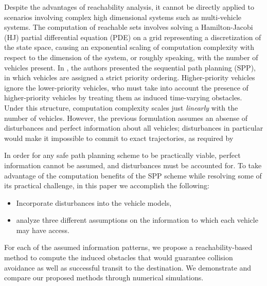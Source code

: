 Despite the advantages of reachability analysis, it cannot be directly applied to scenarios involving complex high dimensional systems such as multi-vehicle systems. The computation of reachable sets involves solving a Hamilton-Jacobi (HJ) partial differential equation (PDE) on a grid representing a discretization of the state space, causing an exponential scaling of computation complexity with respect to the dimension of the system, or roughly speaking, with the number of vehicles present. In \cite{Chen15}, the authors presented the sequential path planning (SPP), in which vehicles are assigned a strict priority ordering.  Higher-priority vehicles ignore the lower-priority vehicles, who must take into account the presence of higher-priority vehicles by treating them as induced time-varying obstacles. Under this structure, computation complexity scales just \textit{linearly} with the number of vehicles. However, the previous formulation assumes an absense of disturbances and perfect information about all vehicles; disturbances in particular would make it impossible to commit to exact trajectories, as required by \cite{Chen15}

In order for any safe path planning scheme to be practically viable, perfect information cannot be assumed, and disturbances must be accounted for. To take advantage of the computation benefits of the SPP scheme while resolving some of its practical challenge, in this paper we accomplish the following:

\begin{itemize}
\item Incorporate disturbances into the vehicle models,
\item analyze three different assumptions on the information to which each vehicle may have access.
\end{itemize}

For each of the assumed information patterns, we propose a reachability-based method to compute the induced obstacles that would guarantee collision avoidance as well as successful transit to the destination. We demonstrate and compare our proposed methods through numerical simulations.